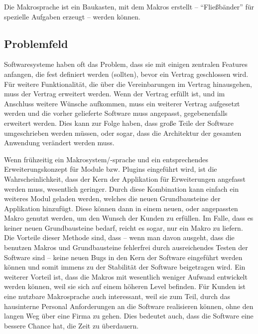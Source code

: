   Die Makrosprache ist ein Baukasten, mit dem Makros erstellt -- ``Fließbänder'' für spezielle Aufgaben erzeugt -- werden können.

  \subsection{Problemfeld}
  \label{ssec:Problemfeld}
    Softwaresysteme haben oft das Problem, dass sie mit einigen zentralen Features anfangen, die fest definiert werden (sollten), bevor ein Vertrag geschlossen wird. Für weitere Funktionalität, die über die Vereinbarungen im Vertrag hinausgehen, muss der Vertrag erweitert werden. Wenn der Vertrag erfüllt ist, und im Anschluss weitere Wünsche aufkommen, muss ein weiterer Vertrag aufgesetzt werden und die vorher gelieferte Software muss angepasst, gegebenenfalls erweitert werden. Dies kann zur Folge haben, dass große Teile der Software umgeschrieben werden müssen, oder sogar, dass die Architektur der gesamten Anwendung verändert werden muss.

    Wenn frühzeitig ein Makrosystem/-sprache und ein entsprechendes Erweiterungskonzept für Module bzw. Plugins eingeführt wird, ist die Wahrscheinlichkeit, dass der Kern der Applikation für Erweiterungen angefasst werden muss, wesentlich geringer. Durch diese Kombination kann einfach ein weiteres Modul geladen werden, welches die neuen Grundbausteine der Applikation hinzufügt. Diese können dann in einem neuen, oder angepassten Makro genutzt werden, um den Wunsch der Kunden zu erfüllen. Im Falle, dass es keiner neuen Grundbausteine bedarf, reicht es sogar, nur ein Makro zu liefern. Die Vorteile dieser Methode sind, dass -- wenn man davon ausgeht, dass die benutzen Makros und Grundbausteine fehlerfrei durch ausreichendes Testen der Software sind -- keine neuen Bugs in den Kern der Software eingeführt werden können und somit immens zu der Stabilität der Software beigetragen wird. Ein weiterer Vorteil ist, dass die Makros mit wesentlich weniger Aufwand entwickelt werden können, weil sie sich auf einem höheren Level befinden. Für Kunden ist eine nutzbare Makrosprache auch interessant, weil sie zum Teil, durch das hausinterne Personal Anforderungen an die Software realisieren können, ohne den langen Weg über eine Firma zu gehen. Dies bedeutet auch, dass die Software eine bessere Chance hat, die Zeit zu überdauern.

